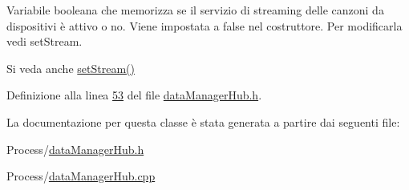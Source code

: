 \-Variabile booleana che memorizza se il servizio di streaming delle canzoni da dispositivi è attivo o no. \-Viene impostata a false nel costruttore. \-Per modificarla vedi set\-Stream. 

\begin{DoxySeeAlso}{\-Si veda anche}
\hyperlink{classdataManager_a454263e6cf2ca50cc53afc8bae0e0e58}{set\-Stream()} 
\end{DoxySeeAlso}


\-Definizione alla linea \hyperlink{dataManagerHub_8h_source_l00053}{53} del file \hyperlink{dataManagerHub_8h_source}{data\-Manager\-Hub.\-h}.



\-La documentazione per questa classe è stata generata a partire dai seguenti file\-:\begin{DoxyCompactItemize}
\item 
\-Process/\hyperlink{dataManagerHub_8h}{data\-Manager\-Hub.\-h}\item 
\-Process/\hyperlink{dataManagerHub_8cpp}{data\-Manager\-Hub.\-cpp}\end{DoxyCompactItemize}
